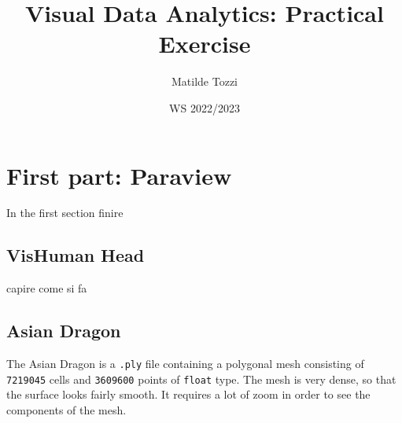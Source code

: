 \documentclass[openany]{article}
\title{Visual Data Analytics: Practical Exercise}
\date{WS 2022/2023}
\author{Matilde Tozzi}
\begin{document}
\maketitle

\section {First part: Paraview}

In the first section {\huge finire}

\subsection {VisHuman Head}

{\huge capire come si fa}

\subsection {Asian Dragon} 

The Asian Dragon is a \texttt{.ply} file containing a polygonal mesh consisting of \texttt{7219045} cells and \texttt{3609600} points of \texttt{float} type. The mesh is very dense, so that the surface looks fairly smooth. It requires a lot of zoom in order to see the components of the mesh.
\end{document}
